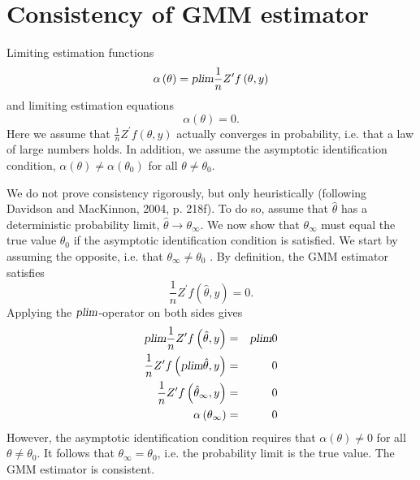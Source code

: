\documentclass{article}
\begin{document}
\section{Consistency of GMM estimator}

Limiting estimation functions%
\begin{equation*}
\alpha \left( \theta \right) =\textsl{plim}\frac{1}{n}Z^{\prime }f\left(
\theta ,y\right)
\end{equation*}%
and limiting estimation equations%
\begin{equation*}
\alpha \left( \theta \right) =0.
\end{equation*}%
Here we assume that $\frac{1}{n}Z^{\prime }f\left( \theta ,y\right) $
actually converges in probability, i.e. that a law of large numbers holds.
In addition, we assume the asymptotic identification condition, $\alpha
\left( \theta \right) \neq \alpha \left( \theta _{0}\right) $ for all $%
\theta \neq \theta _{0}$.

We do not prove consistency rigorously, but only heuristically (following
Davidson and MacKinnon, 2004, p. 218f). To do so, assume that $\hat{\theta}$
has a deterministic probability limit, $\hat{\theta}\rightarrow \theta
_{\infty }$. We now show that $\theta _{\infty }$ must equal the true value $%
\theta _{0}$ if the asymptotic identification condition is satisfied. We
start by assuming the opposite, i.e. that $\theta _{\infty }\neq \theta _{0}$%
. By definition, the GMM estimator satisfies%
\begin{equation*}
\frac{1}{n}Z^{\prime }f\left( \hat{\theta},y\right) =0.
\end{equation*}%
Applying the $\textsl{plim}$-operator on both sides gives%
\begin{eqnarray*}
\textsl{plim}\frac{1}{n}Z^{\prime }f\left( \hat{\theta},y\right) &=&%
\textsl{plim}0 \\
\frac{1}{n}Z^{\prime }f\left( \textsl{plim}\hat{\theta},y\right) &=&0 \\
\frac{1}{n}Z^{\prime }f\left( \hat{\theta}_{\infty },y\right) &=&0 \\
\alpha \left( \theta _{\infty }\right) &=&0
\end{eqnarray*}%
However, the asymptotic identification condition requires that $\alpha
\left( \theta \right) \neq 0$ for all $\theta \neq \theta _{0}.$ It follows
that $\theta _{\infty }=\theta _{0}$, i.e. the probability limit is the true
value. The GMM estimator is consistent.
\end{document}
